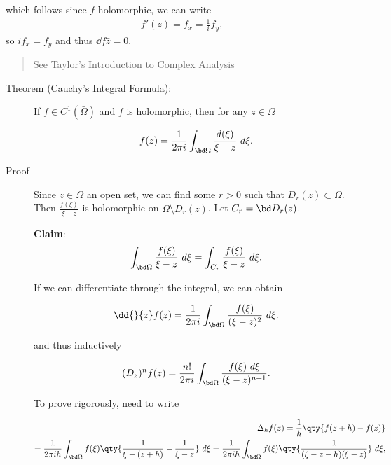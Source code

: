 which follows since \(f\) holomorphic, we can write
\begin{align*}f'(z) = f_x = \frac 1 i f_y,\end{align*} so
\(i f_x = f_y\) and thus \(\dd{f}{\bar z} = 0\).

\begin{quote}
See Taylor's Introduction to Complex Analysis
\end{quote}

\begin{description}
\item[Theorem (Cauchy's Integral Formula):]
If \(f\in C^1(\bar \Omega)\) and \(f\) is holomorphic, then for any
\(z\in \Omega\)

\begin{align*}
f(z) = \frac{1}{2\pi i} \int_{\bd \Omega} \frac{d(\xi)}{\xi - z} ~d\xi
.\end{align*}
\item[Proof]
Since \(z\in \Omega\) an open set, we can find some \(r> 0\) such that
\(D_r(z) \subset \Omega\). Then \(\frac{f(\xi)}{\xi - z}\) is
holomorphic on \(\Omega\setminus D_r(z)\). Let \(C_r = \bd D_r(z)\).

\textbf{Claim}:
\begin{align*}\int_{\bd \Omega} \frac{f(\xi)}{\xi - z} ~d\xi = \int_{C_r} \frac{f(\xi)}{\xi - z} ~ d\xi.\end{align*}

If we can differentiate through the integral, we can obtain

\begin{align*}
\dd{}{z} f(z) = \frac 1 {2\pi i} \int_{\bd \Omega} \frac{f(\xi)}{(\xi - z)^2} ~d\xi
.\end{align*}

and thus inductively

\begin{align*}
(D_z)^n f(z) = \frac{n!}{2\pi i} \int_{\bd \Omega} \frac{ f(\xi) ~d\xi  }{ (\xi - z)^{n+1}  }
.\end{align*}

To prove rigorously, need to write

\begin{align*}
\Delta_h f(z) 
= \frac 1 h \qty{ f(z+h) - f(z) } \\
= \frac 1 {2\pi i h} \int_{\bd \Omega} f(\xi) \qty{ \frac{1}{\xi - (z+h)} - \frac{1}{\xi - z}  } ~d\xi
= \frac 1 {2\pi i h} \int_{\bd \Omega} f(\xi) \qty{ \frac{1}{ (\xi - z- h)(\xi - z)  }  } ~d\xi
,\end{align*}


\end{description}
